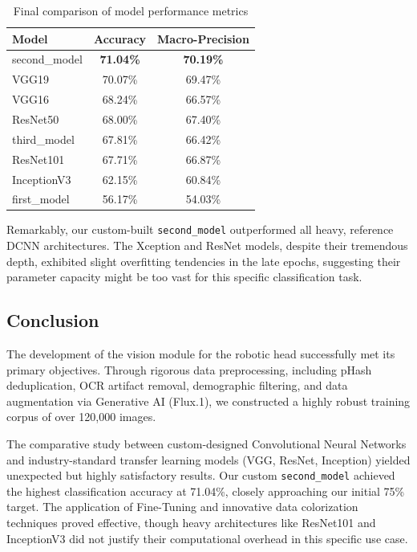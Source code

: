 \documentclass{article}
\begin{document}
\begin{table}[H]
    \centering
    \begin{tabular}{|l|c|c|}
        \hline
        \textbf{Model} & \textbf{Accuracy} & \textbf{Macro-Precision} \\
        \hline
        second\_model & \textbf{71.04\%} & \textbf{70.19\%} \\
        VGG19 & 70.07\% & 69.47\% \\
        VGG16 & 68.24\% & 66.57\% \\
        ResNet50 & 68.00\% & 67.40\% \\
        third\_model & 67.81\% & 66.42\% \\
        ResNet101 & 67.71\% & 66.87\% \\
        InceptionV3 & 62.15\% & 60.84\% \\
        first\_model & 56.17\% & 54.03\% \\
        \hline
    \end{tabular}
    \caption{Final comparison of model performance metrics}
    \label{tab:final_results}
\end{table}

Remarkably, our custom-built \texttt{second\_model} outperformed all heavy, reference DCNN architectures. The Xception and ResNet models, despite their tremendous depth, exhibited slight overfitting tendencies in the late epochs, suggesting their parameter capacity might be too vast for this specific classification task.

\subsection{Conclusion}
The development of the vision module for the robotic head successfully met its primary objectives. Through rigorous data preprocessing, including pHash deduplication, OCR artifact removal, demographic filtering, and data augmentation via Generative AI (Flux.1), we constructed a highly robust training corpus of over 120,000 images.

The comparative study between custom-designed Convolutional Neural Networks and industry-standard transfer learning models (VGG, ResNet, Inception) yielded unexpected but highly satisfactory results. Our custom \texttt{second\_model} achieved the highest classification accuracy at 71.04\%, closely approaching our initial 75\% target. The application of Fine-Tuning and innovative data colorization techniques proved effective, though heavy architectures like ResNet101 and InceptionV3 did not justify their computational overhead in this specific use case. 
\end{document}
